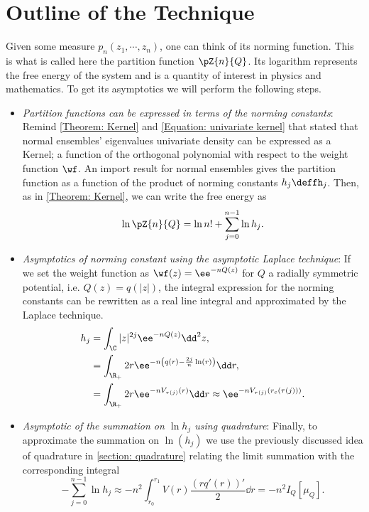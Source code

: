 \section{Outline of the Technique}
\label{Section: outline asymptotic}

Given some measure $p_n (z_1, \cdots, z_n)$, one can think of its norming function. This is what is called here the partition function $\pZ{n}{Q}$. Its logarithm represents the free energy of the system and is a quantity of interest in physics and mathematics. To get its asymptotics we will perform the following steps.

\begin{itemize}
	\item \textit{Partition functions can be expressed in terms of the norming constants}:  Remind \autoref{Theorem: Kernel} and \eqref{Equation: univariate kernel} that stated that normal ensembles' eigenvalues univariate density can be expressed as a Kernel; a function of the orthogonal polynomial with respect to the weight function $\wf$. An import result for normal ensembles gives the partition function as a function of the product of norming constants $h_j \deffh_j$. Then, as in \ref{Theorem: Kernel}, we can write the free energy as
	\begin{equation}
			\ln \pZ{n}{Q} = \ln{n!} + \sum_{j=0}^{n-1} \ln{h_j}.
	\end{equation}
	\item \textit{Asymptotics of norming constant using the asymptotic Laplace technique}: If we set the weight function as $\wf(z) = \ee^{-nQ(z)}$ for $Q$ a radially symmetric potential, i.e. $Q(z) = q(|z|)$, the integral expression for the norming constants can be rewritten as a real line integral and approximated by the Laplace technique.
	\begin{align}
			h_j 
			& = \int_{\C} |z|^{2j} \ee^{-n Q(z)} \dd^2 z, \\
			& =  \int_{\R_+} 2 r \ee^{-n \left( q(r) - \frac{2j}{n} \ln(r) \right)} \dd r, \\
			&= \int_{\R_+} 2r \ee^{-n V_{\tau(j)}(r)} \dd r \approx \ee^{-n V_{\tau(j)}(r_c(\tau(j)))}.
	\end{align}
	\item \textit{Asymptotic of the summation on $\ln h_j$ using quadrature}: Finally, to approximate the summation on $\ln(h_j)$ we use the previously discussed idea of quadrature in \autoref{section: quadrature} relating the limit summation with the corresponding integral
	\begin{equation}
		- \sum_{j=0}^{n-1} \ln{h_j} \approx - n^2 \int_{r_0}^{r_1} V(r) \frac{(r q'(r))'}{2} \dd r = - n^2 I_Q[\mu_Q].
	\end{equation}
\end{itemize}

